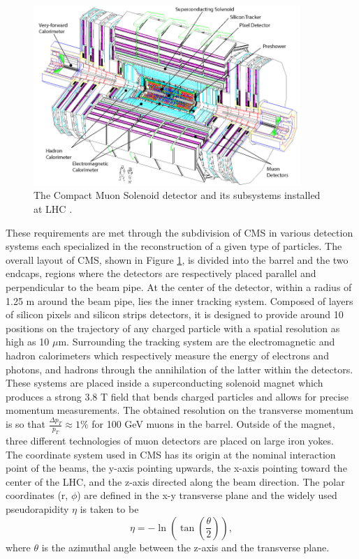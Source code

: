     \begin{figure}[t!]
      \centering
      \includegraphics[width=0.9\textwidth]{img/I-3-cms/cms.pdf}
      \caption{The Compact Muon Solenoid detector and its subsystems installed at LHC \cite{1748-0221-3-08-S08004}.}
      \label{fig:I-3-cms-global-view}
    \end{figure}

    These requirements are met through the subdivision of CMS in various detection systems each specialized in the reconstruction of a given type of particles. The overall layout of CMS, shown in Figure \ref{fig:I-3-cms-global-view}, is divided into the barrel and the two endcaps, regions where the detectors are respectively placed parallel and perpendicular to the beam pipe. At the center of the detector, within a radius of 1.25 m around the beam pipe, lies the inner tracking system. Composed of layers of silicon pixels and silicon strips detectors, it is designed to provide around 10 positions on the trajectory of any charged particle with a spatial resolution as high as 10 $\mu$m. Surrounding the tracking system are the electromagnetic and hadron calorimeters which respectively measure the energy of electrons and photons, and hadrons through the annihilation of the latter within the detectors. These systems are placed inside a superconducting solenoid magnet which produces a strong 3.8 T field that bends charged particles and allows for precise momentum measurements. The obtained resolution on the transverse momentum is so that $\frac{\Delta p_T}{p_T} \approx 1\% $ for 100 GeV muons in the barrel. Outside of the magnet, three different technologies of muon detectors are placed on large iron yokes. \\

    The coordinate system used in CMS has its origin at the nominal interaction point of the beams, the y-axis pointing upwards, the x-axis pointing toward the center of the LHC, and the z-axis directed along the beam direction. The polar coordinates (r, $ \phi $) are defined in the x-y transverse plane and the widely used pseudorapidity $ \eta $ is taken to be
    \begin{equation}
      \eta = - \ln\left( \tan\left( \frac{\theta}{2} \right) \right) ,
    \end{equation}
    where $ \theta $ is the azimuthal angle between the z-axis and the transverse plane.

